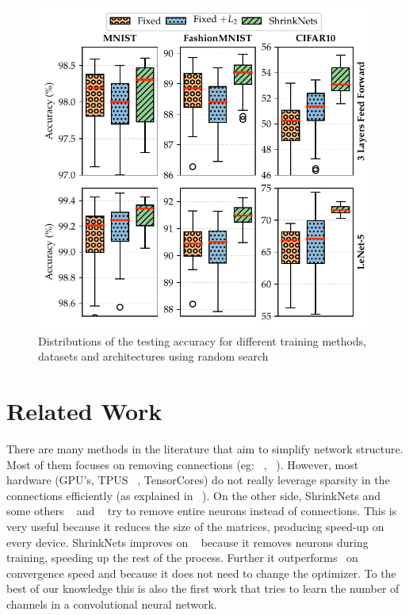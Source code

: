 \documentclass[sigconf]{acmart}
\begin{document}
\begin{figure}
\vspace{-.2in}
\begin{center}
  \includegraphics[width=0.9\columnwidth]{hyper_opt}
  \vspace{-.2in}
\caption{Distributions of the testing accuracy for different training methods, datasets and architectures using random search\label{hyper_opt_res}}
\vspace{-.2in}
\end{center}
\end{figure}

\section{Related Work}

\par There are many methods in the literature that aim to simplify 
network structure. Most of them focuses on removing connections (eg: ~\cite{Cun},
~\cite{Han2015}).  However, most hardware (GPU's, TPUS ~\cite{Jouppi2017}, TensorCores) do not really
leverage sparsity in the connections efficiently (as explained in ~\cite{Han2016}). On the other side, ShrinkNets
and some others ~\cite{Scardapane2017} and ~\cite{Philipp} try to remove entire neurons instead of
connections. This is very useful because it reduces the size of the matrices,
producing speed-up on every device. ShrinkNets improves on
~\cite{Scardapane2017} because it removes neurons during training, speeding up
the rest of the process.  Further it outperforms~\cite{Philipp} on convergence speed and because it does not need to change the optimizer. To the best of our knowledge this is
also the first work that tries to learn the number of channels in a
convolutional neural network.
\end{document}
